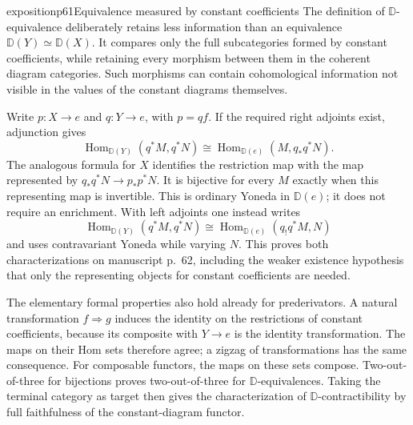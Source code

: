 \begin{dcomment}{exposition}{p61}{Equivalence measured by constant coefficients}
The definition of $\mathbb D$-equivalence deliberately retains less information than an equivalence $\mathbb D(Y)\simeq\mathbb D(X)$. It compares only the full subcategories formed by constant coefficients, while retaining every morphism between them in the coherent diagram categories. Such morphisms can contain cohomological information not visible in the values of the constant diagrams themselves.

Write $p:X\to e$ and $q:Y\to e$, with $p=qf$. If the required right adjoints exist, adjunction gives
\[
 \operatorname{Hom}_{\mathbb D(Y)}(q^*M,q^*N)
 \cong\operatorname{Hom}_{\mathbb D(e)}(M,q_*q^*N).
\]
The analogous formula for $X$ identifies the restriction map with the map represented by $q_*q^*N\to p_*p^*N$. It is bijective for every $M$ exactly when this representing map is invertible. This is ordinary Yoneda in $\mathbb D(e)$; it does not require an enrichment. With left adjoints one instead writes
\[
 \operatorname{Hom}_{\mathbb D(Y)}(q^*M,q^*N)
 \cong\operatorname{Hom}_{\mathbb D(e)}(q_!q^*M,N)
\]
and uses contravariant Yoneda while varying $N$. This proves both characterizations on manuscript p.~62, including the weaker existence hypothesis that only the representing objects for constant coefficients are needed.

The elementary formal properties also hold already for prederivators. A natural transformation $f\Rightarrow g$ induces the identity on the restrictions of constant coefficients, because its composite with $Y\to e$ is the identity transformation. The maps on their Hom sets therefore agree; a zigzag of transformations has the same consequence. For composable functors, the maps on these sets compose. Two-out-of-three for bijections proves two-out-of-three for $\mathbb D$-equivalences. Taking the terminal category as target then gives the characterization of $\mathbb D$-contractibility by full faithfulness of the constant-diagram functor.


\end{dcomment}
